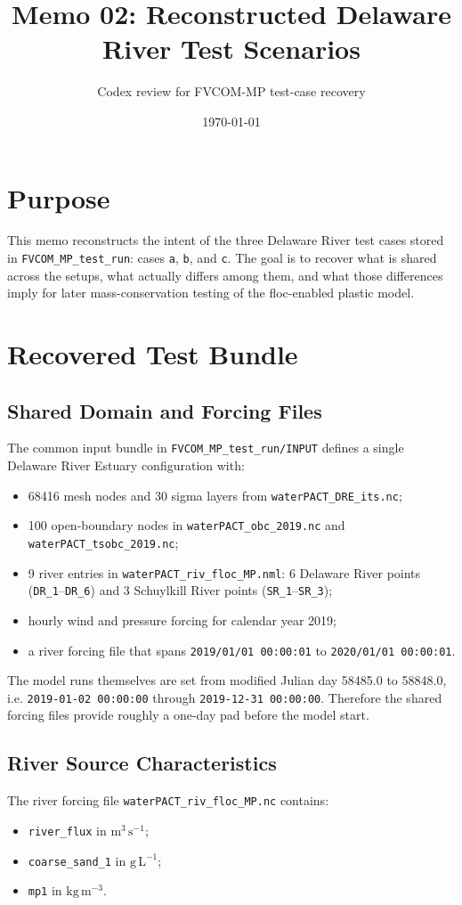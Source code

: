 \documentclass[11pt]{article}
\title{Memo 02: Reconstructed Delaware River Test Scenarios}
\author{Codex review for FVCOM-MP test-case recovery}
\date{\today}
\begin{document}
\maketitle

\section{Purpose}
This memo reconstructs the intent of the three Delaware River test cases stored in
\texttt{FVCOM\_MP\_test\_run}: cases \texttt{a}, \texttt{b}, and \texttt{c}. The goal is to recover
what is shared across the setups, what actually differs among them, and what those differences imply
for later mass-conservation testing of the floc-enabled plastic model.

\section{Recovered Test Bundle}
\subsection{Shared Domain and Forcing Files}
The common input bundle in \texttt{FVCOM\_MP\_test\_run/INPUT} defines a single Delaware River Estuary
configuration with:
\begin{itemize}
\item 68416 mesh nodes and 30 sigma layers from \texttt{waterPACT\_DRE\_its.nc};
\item 100 open-boundary nodes in \texttt{waterPACT\_obc\_2019.nc} and \texttt{waterPACT\_tsobc\_2019.nc};
\item 9 river entries in \texttt{waterPACT\_riv\_floc\_MP.nml}: 6 Delaware River points
(\texttt{DR\_1}--\texttt{DR\_6}) and 3 Schuylkill River points (\texttt{SR\_1}--\texttt{SR\_3});
\item hourly wind and pressure forcing for calendar year 2019;
\item a river forcing file that spans \texttt{2019/01/01 00:00:01} to \texttt{2020/01/01 00:00:01}.
\end{itemize}

The model runs themselves are set from modified Julian day 58485.0 to 58848.0, i.e.
\texttt{2019-01-02 00:00:00} through \texttt{2019-12-31 00:00:00}. Therefore the shared forcing files
provide roughly a one-day pad before the model start.

\subsection{River Source Characteristics}
The river forcing file \texttt{waterPACT\_riv\_floc\_MP.nc} contains:
\begin{itemize}
\item \texttt{river\_flux} in \(\mathrm{m^3\,s^{-1}}\);
\item \texttt{coarse\_sand\_1} in \(\mathrm{g\,L^{-1}}\);
\item \texttt{mp1} in \(\mathrm{kg\,m^{-3}}\).
\end{itemize}
\end{document}
